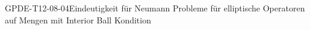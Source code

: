 
\begin{KORO}{GPDE-T12-08-04}{Eindeutigkeit für Neumann Probleme für elliptische Operatoren auf Mengen mit Interior Ball Kondition}
\end{KORO}
